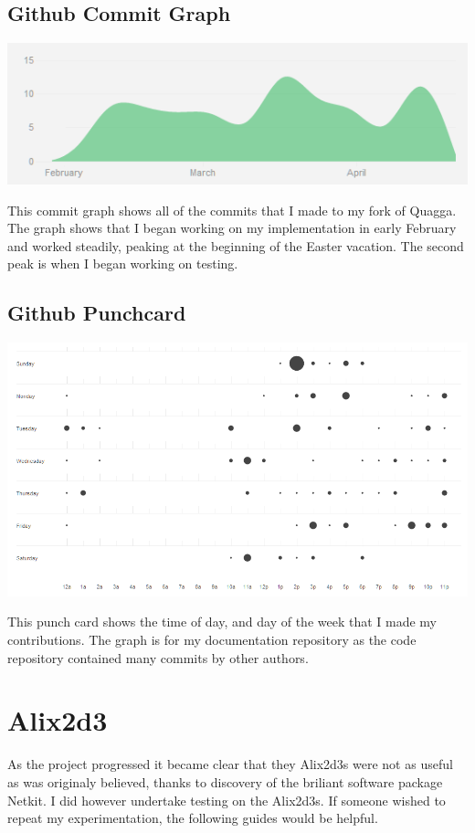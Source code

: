 \section*{Github Commit Graph}
\begin{center}
	\includegraphics[width=\linewidth]{../Diagrams/Stats/GitHubCommitGraph.png}
\end{center}

This commit graph shows all of the commits that I made to my fork of Quagga.
The graph shows that I began working on my implementation in early February and
worked steadily, peaking at the beginning of the Easter vacation. The second
peak is when I began working on testing.

\section*{Github Punchcard}
\begin{center}
	\includegraphics[width=\linewidth]{../Diagrams/Stats/GitHubPunchCard.png}
\end{center}

This punch card shows the time of day, and day of the week that I made 
my contributions. The graph is for my documentation repository as the code
repository contained many commits by other authors.

\chapter{Alix2d3}
As the project progressed it became clear that they Alix2d3s were not as useful
as was originaly believed, thanks to discovery of the briliant software package
Netkit. I did however undertake testing on the Alix2d3s. If someone wished to
repeat my experimentation, the following guides would be helpful. 

